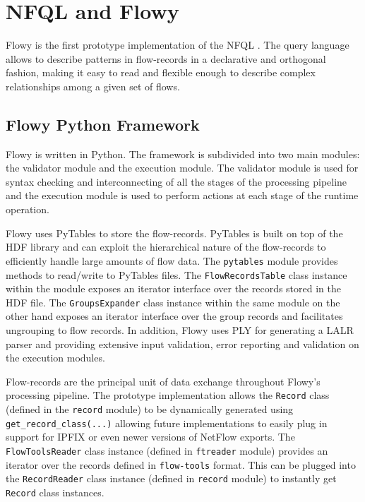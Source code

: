 \chapter{NFQL and Flowy}\label{ch:flowy-design}

Flowy \cite{kkanev:2010, kkanev:thesis:2009} is the first prototype
implementation of the \ac{NFQL} \cite{vmarinov:thesis:2009, vmarinov:2009,
vmarinov:2008}. The query language allows to describe patterns in flow-records
in a declarative and orthogonal fashion, making it easy to read and flexible
enough to describe complex relationships among a given set of flows.

\section{Flowy Python Framework}\label{sec:python-framework} 
Flowy is written in Python. The framework is subdivided into two main modules:
the validator module and the execution module. The validator module is used
for syntax checking and interconnecting of all the stages of the processing
pipeline and the execution module is used to perform actions at each stage of
the runtime operation.

Flowy uses PyTables \cite{falted:2003} to store the flow-records. PyTables is
built on top of the \ac{HDF} library and can exploit the hierarchical nature
of the flow-records to efficiently handle large amounts of flow data. The
\texttt{pytables} module provides methods to read/write to PyTables files. The
\texttt{FlowRecordsTable} class instance within 
the module exposes an iterator interface over the records stored in the HDF
file. The \texttt{GroupsExpander} class instance within the same module on the
other hand exposes an iterator interface over the group records and
facilitates ungrouping to flow records.  In addition, Flowy uses \ac{PLY} for
generating a \ac{LALR} parser and providing extensive input validation, error
reporting and validation on the execution modules.

Flow-records are the principal unit of data exchange throughout Flowy's
processing pipeline. The prototype implementation allows the \texttt{Record}
class (defined in the \texttt{record} module) to be dynamically generated
using \texttt{get\_record\_class(...)} allowing future implementations to
easily plug in support  for \ac{IPFIX} or even newer
versions of NetFlow \cite{rfc3954} exports. The \texttt{FlowToolsReader} class
instance (defined in \texttt{ftreader} module) provides an iterator over the
records defined in \texttt{flow-tools} format. This can be plugged into the
\texttt{RecordReader} class instance (defined in \texttt{record} module) to
instantly get \texttt{Record} class instances.

